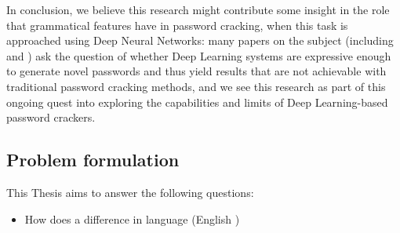 In conclusion, we believe this research might contribute some insight in the role that grammatical features have in password cracking, when this task is approached using Deep Neural Networks: many papers on the subject (including \cite{PassGAN} and \cite{Melicher2016}) ask the question of whether Deep Learning systems are expressive enough to generate novel passwords and thus yield results that are not achievable with traditional password cracking methods, and we see this research as part of this ongoing quest into exploring the capabilities and limits of Deep Learning-based password crackers.

\subsection{Problem formulation}
This Thesis aims to answer the following questions:
\begin{itemize}
\item How does a difference in language (English )
\end{itemize}

